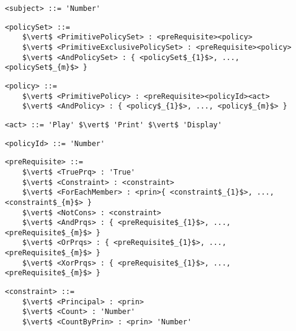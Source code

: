 \lstset{mathescape, language=AST}  
\begin{lstlisting}[frame=single, caption={subject},label={lst:subject}]
<subject> ::= 'Number'
\end{lstlisting}




\lstset{mathescape, language=AST}  
\begin{lstlisting}[frame=single, caption={policySet},label={lst:policySet}]
<policySet> ::=  
	$\vert$ <PrimitivePolicySet> : <preRequisite><policy> 
	$\vert$ <PrimitiveExclusivePolicySet> : <preRequisite><policy>	 
	$\vert$ <AndPolicySet> : { <policySet$_{1}$>, ..., <policySet$_{m}$> }	
\end{lstlisting}



\lstset{mathescape, language=AST}  
\begin{lstlisting}[frame=single, caption={policy},label={lst:policy}]
<policy> ::=  
	$\vert$ <PrimitivePolicy> : <preRequisite><policyId><act>
	$\vert$ <AndPolicy> : { <policy$_{1}$>, ..., <policy$_{m}$> }	
\end{lstlisting}


\lstset{mathescape, language=AST}  
\begin{lstlisting}[frame=single, caption={act},label={lst:act}]
<act> ::= 'Play' $\vert$ 'Print' $\vert$ 'Display'
\end{lstlisting}


\lstset{mathescape, language=AST}  
\begin{lstlisting}[frame=single, caption={policyId},label={lst:policyId}]
<policyId> ::= 'Number'
\end{lstlisting}



\lstset{mathescape, language=AST}  
\begin{lstlisting}[frame=single, caption={preRequisite},label={lst:preRequisite}]
<preRequisite> ::=  
	$\vert$ <TruePrq> : 'True'
	$\vert$ <Constraint> : <constraint>	 
	$\vert$ <ForEachMember> : <prin>{ <constraint$_{1}$>, ..., <constraint$_{m}$> }	
	$\vert$ <NotCons> : <constraint>
	$\vert$ <AndPrqs> : { <preRequisite$_{1}$>, ..., <preRequisite$_{m}$> }		 
	$\vert$ <OrPrqs> : { <preRequisite$_{1}$>, ..., <preRequisite$_{m}$> }	
	$\vert$ <XorPrqs> : { <preRequisite$_{1}$>, ..., <preRequisite$_{m}$> }		
\end{lstlisting}


\lstset{mathescape, language=AST}  
\begin{lstlisting}[frame=single, caption={constraint},label={lst:constraint}]
<constraint> ::=  
	$\vert$ <Principal> : <prin>
	$\vert$ <Count> : 'Number'	 
	$\vert$ <CountByPrin> : <prin> 'Number'
\end{lstlisting}

